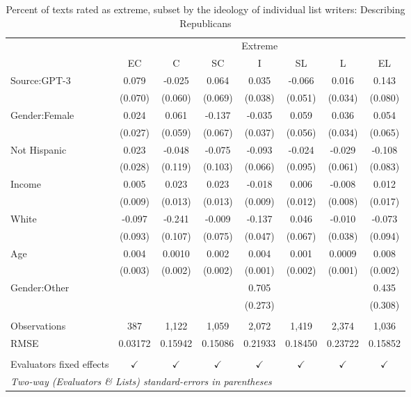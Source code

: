 \documentclass[11pt]{article}
\begin{document}
\begin{table}
\centering
%
\begin{tabular}{lccccccc}
\toprule
&\multicolumn{7}{c}{Extreme}\\
& EC & C & SC & I & SL & L & EL\\
\midrule Source:GPT-3&0.079 & -0.025 & 0.064 & 0.035 & -0.066 & 0.016 & 0.143\\
  &(0.070) & (0.060) & (0.069) & (0.038) & (0.051) & (0.034) & (0.080)\\
Gender:Female&0.024 & 0.061 & -0.137 & -0.035 & 0.059 & 0.036 & 0.054\\
  &(0.027) & (0.059) & (0.067) & (0.037) & (0.056) & (0.034) & (0.065)\\
Not Hispanic&0.023 & -0.048 & -0.075 & -0.093 & -0.024 & -0.029 & -0.108\\
  &(0.028) & (0.119) & (0.103) & (0.066) & (0.095) & (0.061) & (0.083)\\
Income&0.005 & 0.023 & 0.023 & -0.018 & 0.006 & -0.008 & 0.012\\
  &(0.009) & (0.013) & (0.013) & (0.009) & (0.012) & (0.008) & (0.017)\\
White&-0.097 & -0.241 & -0.009 & -0.137 & 0.046 & -0.010 & -0.073\\
  &(0.093) & (0.107) & (0.075) & (0.047) & (0.067) & (0.038) & (0.094)\\
Age&0.004 & 0.0010 & 0.002 & 0.004 & 0.001 & 0.0009 & 0.008\\
  &(0.003) & (0.002) & (0.002) & (0.001) & (0.002) & (0.001) & (0.002)\\
Gender:Other&   &    &    & 0.705 &    &    & 0.435\\
  &   &    &    & (0.273) &    &    & (0.308)\\
 &  & & & & & & \\
Observations & 387&1,122&1,059&2,072&1,419&2,374&1,036\\
RMSE & 0.03172&0.15942&0.15086&0.21933&0.18450&0.23722&0.15852\\
 &   &   &   &   &   &   &  \\
Evaluators fixed effects & $\checkmark$ & $\checkmark$ & $\checkmark$ & $\checkmark$ & $\checkmark$ & $\checkmark$ & $\checkmark$\\
\bottomrule
\multicolumn{8}{l}{\emph{Two-way (Evaluators \& Lists) standard-errors in parentheses}}\\
\end{tabular}
%
\caption{Percent of texts rated as extreme, subset by the ideology of individual list writers: Describing Republicans}
\label{tab:f4a3}
\end{table}
\end{document}
